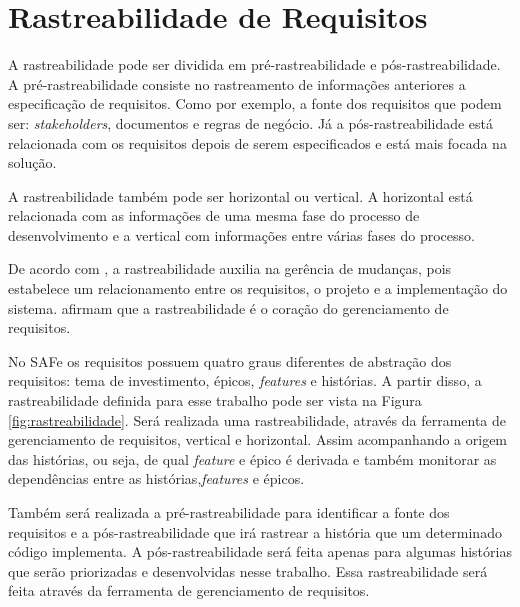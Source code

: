 \section[Rastreabilidade de Requisitos]{Rastreabilidade de Requisitos}

A rastreabilidade pode ser dividida em pré-rastreabilidade e pós-rastreabilidade. 
A pré-rastreabilidade consiste no rastreamento de informações anteriores a especificação
de requisitos. Como por exemplo, a fonte dos requisitos que podem ser: \textit{stakeholders},
documentos e regras de negócio. Já a pós-rastreabilidade está relacionada com os requisitos depois 
de serem especificados e está mais focada na solução. \cite{persson}

A rastreabilidade também pode ser horizontal ou vertical. A horizontal está relacionada com
as informações de uma mesma fase do processo de desenvolvimento e a vertical
com informações entre várias fases do processo. \cite{persson}

De acordo com , a rastreabilidade auxilia na gerência de mudanças, 
pois estabelece um relacionamento entre os requisitos, o projeto e a implementação do sistema. 
afirmam que a rastreabilidade é o coração do gerenciamento de requisitos.

No SAFe os requisitos possuem quatro graus diferentes de abstração dos requisitos: tema de investimento, épicos, \textit{features} e histórias.
A partir disso, a rastreabilidade definida para esse trabalho pode ser vista na Figura \ref{fig:rastreabilidade}.
Será realizada uma rastreabilidade, através da ferramenta de gerenciamento de requisitos, vertical e horizontal. Assim acompanhando
a origem das histórias, ou seja, de qual \textit{feature} e épico é derivada e também monitorar as dependências entre as histórias,\textit{features} e épicos.

Também será realizada a pré-rastreabilidade para identificar a fonte dos requisitos e a pós-rastreabilidade que irá rastrear a história que um determinado
código implementa. A pós-rastreabilidade será feita apenas para algumas histórias que serão priorizadas e desenvolvidas nesse trabalho.
Essa rastreabilidade será feita através da ferramenta de gerenciamento de requisitos.

\graphicspath{{figuras/}}

